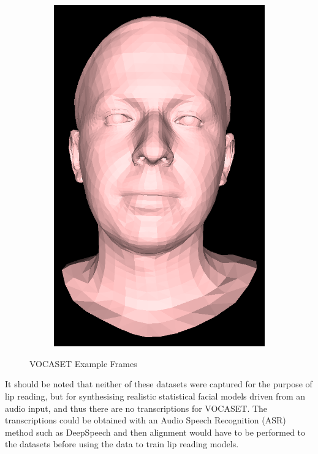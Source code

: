 \documentclass[12pt]{report}
\begin{document}
\begin{figure}[h]
\begin{subfigure}[b]{0.19\textwidth}
        \includegraphics[width=\textwidth]{figures/voca_exp/vocaset_exp5.png}
    \end{subfigure}
    \caption{VOCASET Example Frames \cite{Cudeiro2019}}\label{fig:VOCASET_example}
\end{figure}

It should be noted that neither of these datasets were captured for the purpose of lip reading, but for synthesising realistic statistical facial models driven from an audio input, and thus there are no transcriptions for VOCASET.
The transcriptions could be obtained with an Audio Speech Recognition (ASR) method such as DeepSpeech \cite{Hannun2014} and then alignment would have to be performed to the datasets before using the data to train lip reading models.
\end{document}
